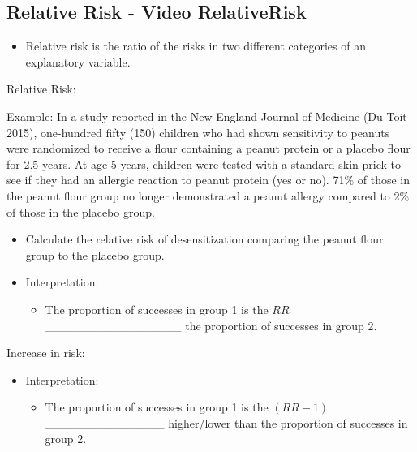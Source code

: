 \documentclass[
]{report}
\providecommand{\tightlist}{%
  \setlength{\itemsep}{0pt}\setlength{\parskip}{0pt}}
\begin{document}
\subsection*{Relative Risk - Video RelativeRisk}\label{relative-risk---video-relativerisk}

\begin{itemize}
\tightlist
\item
  Relative risk is the ratio of the risks in two different categories of an explanatory variable.
\end{itemize}

Relative Risk:

\vspace{0.3in}

Example: In a study reported in the New England Journal of Medicine (Du Toit 2015), one-hundred fifty (150) children who had shown sensitivity to peanuts were randomized to receive a flour containing a peanut protein or a placebo flour for 2.5 years. At age 5 years, children were tested with a standard skin prick to see if they had an allergic reaction to peanut protein (yes or no). 71\% of those in the peanut flour group no longer demonstrated a peanut allergy compared to 2\% of those in the placebo group.

\begin{itemize}
\tightlist
\item
  Calculate the relative risk of desensitization comparing the peanut flour group to the placebo group.
\end{itemize}

\vspace{0.8in}


\begin{itemize}
\item
  Interpretation:

  \begin{itemize}
  \tightlist
  \item
    The proportion of successes in group 1 is the \(RR\) \_\_\_\_\_\_\_\_\_\_\_\_\_\_\_\_ the proportion of successes in group 2.
  \end{itemize}
\end{itemize}

Increase in risk:

\vspace{0.3in}

\begin{itemize}
\item
  Interpretation:

  \begin{itemize}
  \tightlist
  \item
    The proportion of successes in group 1 is the \((RR-1)\) \_\_\_\_\_\_\_\_\_\_\_\_\_\_
    higher/lower than the proportion of successes in group 2.
  \end{itemize}
\end{itemize}
\end{document}
